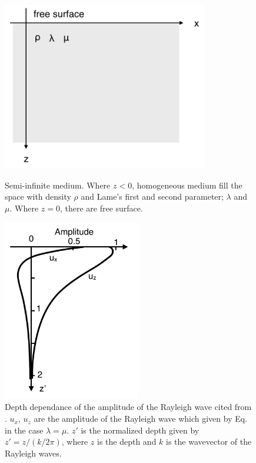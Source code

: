 \begin{figure}[h]
  \begin{minipage}[t]{0.5\hsize}
    \centering      
    \includegraphics[width=9.0cm]{./img_chap3/img301.png}
    \caption{Semi-infinite medium. Where $z<0$, homogeneous medium fill the space with density $\rho$ and Lame's first and second parameter; $\lambda$ and $\mu$. Where $z=0$, there are free surface.}\label{img:img301}
  \end{minipage}    \hspace{1pt}    
  \begin{minipage}[t]{0.5\hsize}
    \centering
    \includegraphics[width=6.0cm]{./img_chap3/img302.png}
    \caption{Depth dependance of the amplitude of the Rayleigh wave cited from \cite{hasegawa2015jishin}. $u_x$, $u_z$ are the amplitude of the Rayleigh wave which given by Eq.\label{eq:eq} in the case $\lambda=\mu$. $z'$ is the normalized depth given by $z'=z/(k/2\pi)$, where $z$ is the depth and $k$ is the wavevector of the Rayleigh waves.}\label{img:img302}
  \end{minipage}
\end{figure}



